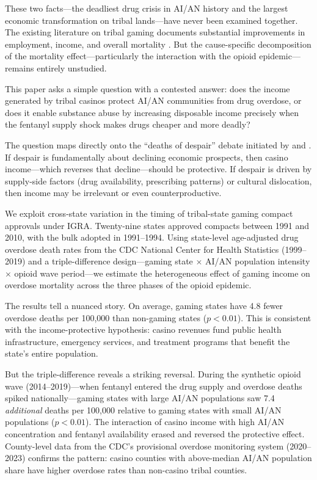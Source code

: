 \documentclass[12pt]{article}
\begin{document}
These two facts---the deadliest drug crisis in AI/AN history and the largest economic transformation on tribal lands---have never been examined together. The existing literature on tribal gaming documents substantial improvements in employment, income, and overall mortality \citep{evans2002economic, akee2015young}. But the cause-specific decomposition of the mortality effect---particularly the interaction with the opioid epidemic---remains entirely unstudied.

This paper asks a simple question with a contested answer: does the income generated by tribal casinos protect AI/AN communities from drug overdose, or does it enable substance abuse by increasing disposable income precisely when the fentanyl supply shock makes drugs cheaper and more deadly?

The question maps directly onto the ``deaths of despair'' debate initiated by \citet{case2015rising} and \citet{case2020deaths}. If despair is fundamentally about declining economic prospects, then casino income---which reverses that decline---should be protective. If despair is driven by supply-side factors (drug availability, prescribing patterns) or cultural dislocation, then income may be irrelevant or even counterproductive.

We exploit cross-state variation in the timing of tribal-state gaming compact approvals under IGRA. Twenty-nine states approved compacts between 1991 and 2010, with the bulk adopted in 1991--1994. Using state-level age-adjusted drug overdose death rates from the CDC National Center for Health Statistics (1999--2019) and a triple-difference design---gaming state $\times$ AI/AN population intensity $\times$ opioid wave period---we estimate the heterogeneous effect of gaming income on overdose mortality across the three phases of the opioid epidemic.

The results tell a nuanced story. On average, gaming states have 4.8 fewer overdose deaths per 100,000 than non-gaming states ($p < 0.01$). This is consistent with the income-protective hypothesis: casino revenues fund public health infrastructure, emergency services, and treatment programs that benefit the state's entire population.

But the triple-difference reveals a striking reversal. During the synthetic opioid wave (2014--2019)---when fentanyl entered the drug supply and overdose deaths spiked nationally---gaming states with large AI/AN populations saw 7.4 \textit{additional} deaths per 100,000 relative to gaming states with small AI/AN populations ($p < 0.01$). The interaction of casino income with high AI/AN concentration and fentanyl availability erased and reversed the protective effect. County-level data from the CDC's provisional overdose monitoring system (2020--2023) confirms the pattern: casino counties with above-median AI/AN population share have higher overdose rates than non-casino tribal counties.
\end{document}
